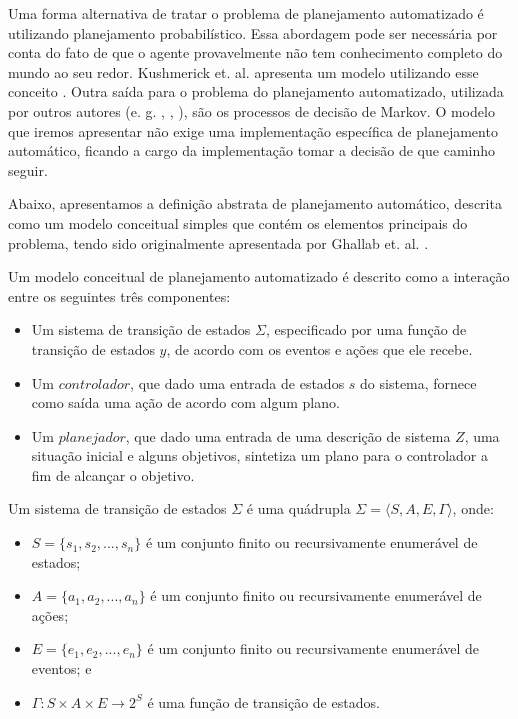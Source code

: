 Uma forma alternativa de tratar o problema de planejamento automatizado é utilizando planejamento probabilístico. Essa abordagem pode ser necessária por conta do fato de que o agente provavelmente não tem conhecimento completo do mundo ao seu redor. Kushmerick et. al. apresenta um modelo utilizando esse conceito \cite{KUSHMERICK1995239}. Outra saída para o problema do planejamento automatizado, utilizada por outros autores (e. g. \cite{Cassandra:1998:EAA:926710}, \cite{DBLP:journals/corr/abs-1105-5460}, \cite{article}), são os processos de decisão de Markov. O modelo que iremos apresentar não exige uma implementação específica de planejamento automático, ficando a cargo da implementação tomar a decisão de que caminho seguir. 

Abaixo, apresentamos a definição abstrata de planejamento automático, descrita como um modelo conceitual simples que contém os elementos principais do problema, tendo sido originalmente apresentada por Ghallab et. al. \cite{GHALLAB20041}.

\begin{definition}{}
\label{definition::autoplanning}
   Um modelo conceitual de planejamento automatizado é descrito como a interação entre os seguintes três componentes:
   
    \begin{itemize}
        \item Um sistema de transição de estados $\Sigma$, especificado por uma função de transição de estados $y$, de acordo com os eventos e ações que ele recebe. 
        \item Um $controlador$, que dado uma entrada de estados $s$ do sistema, fornece como saída uma ação de acordo com algum plano.
        \item Um $planejador$, que dado uma entrada de uma descrição de sistema $Z$, uma situação inicial e alguns objetivos, sintetiza um plano para o controlador a fim de alcançar o objetivo.
    \end{itemize}
    
    Um sistema de transição de estados $\Sigma$ é uma quádrupla $\Sigma = \langle S, A, E, \Gamma \rangle$, onde:
    
    \begin{itemize}
        \item $S = \{s_1, s_2, ..., s_{n}\}$ é um conjunto finito ou recursivamente enumerável de estados;
        \item $A = \{a_1, a_2, ..., a_{n}\}$ é um conjunto finito ou recursivamente enumerável de ações;
        \item $E = \{e_1, e_2, ..., e_{n}\}$ é um conjunto finito ou recursivamente enumerável de eventos; e 
        \item $\Gamma: S \times A \times E \rightarrow 2^S$ é uma função de transição de estados. 
    \end{itemize}
     
\end{definition}